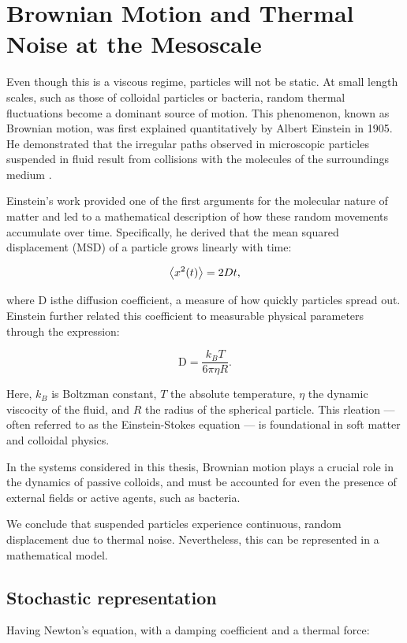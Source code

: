 \section{Brownian Motion and Thermal Noise at the Mesoscale}
Even though this is a viscous regime, particles will not be static. At small length scales, such as those of colloidal particles or bacteria, random thermal fluctuations become a dominant source of motion. This phenomenon, known as Brownian motion, was first explained quantitatively by Albert Einstein in 1905. He demonstrated that the irregular paths observed in microscopic particles suspended in fluid result from collisions with the molecules of the surroundings medium \cite{einstein1906theory}.

Einstein's work provided one of the first arguments for the molecular nature of matter and led to a mathematical description of how these random movements accumulate over time. Specifically, he derived that the mean squared displacement (MSD) of a particle grows linearly with time:

\begin{equation}
  \expval{x^2(t)} = 2Dt\text{,}
  \label{eq:msd}
\end{equation}

where D isthe diffusion coefficient, a measure of how quickly particles spread out. Einstein further related this coefficient to measurable physical parameters through the expression:

\begin{equation}
  \text{D} = \frac{k_{B}T}{6\pi \eta R}\text{.} 
  \label{eq:diffusioncoefficient}
\end{equation}

Here, $k_B$ is Boltzman constant, $T$ the absolute temperature, $\eta$ the dynamic viscocity of the fluid, and $R$ the radius of the spherical particle. This rleation — often referred to as the Einstein-Stokes equation — is foundational in soft matter and colloidal physics.

In the systems considered in this thesis, Brownian motion plays a crucial role in the dynamics of passive colloids, and must be accounted for even the presence of external fields or active agents, such as bacteria.

We conclude that suspended particles experience continuous, random displacement due to thermal noise. Nevertheless, this can be represented in a mathematical model.

\subsection{Stochastic representation}
Having Newton's equation, with a damping coefficient and a thermal force:

